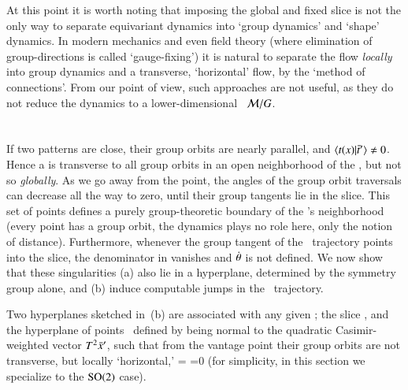 \documentclass[preprint,12pt]{elsarticle} %
\begin{document}
At this point it is worth noting that imposing the global and fixed slice
 is not the only way to separate equivariant dynamics into
`group dynamics' and `shape' dynamics. In modern mechanics
and even field theory (where elimination of group-directions is called
`gauge-fixing') it is natural to separate the flow {\em locally} into group dynamics
and a transverse, `horizontal' flow, by the
`method of connections'. From our point of
view, such approaches are not useful, as they do not reduce the dynamics
to a lower-dimensional \reducedsp\ ${\cal M}/G$.


\section{\Sset}
	\label{sec:singul}

If  two patterns are close, their group orbits are nearly parallel, and
$\braket{\groupTan(\ssp)}{\sliceTan{}} \neq 0$. Hence a {\slice} is
transverse to all group orbits in an open neighborhood of the {\template}
\slicep, but not so {\em globally}. As we go away from
the {\template} point, the angles of the group orbit traversals
can decrease all the way to zero, until their group tangents lie in the slice.
This set of points defines a purely group-theoretic boundary of
the {\template's} neighborhood (every point has a group orbit, the dynamics
plays no role here, only the notion of distance).
Furthermore, whenever the group tangent of the \reducedsp\ trajectory
points into the slice, the denominator in  vanishes
and {\angVel} $\dot{{\bf \theta}}$ is not defined. We now show that these
singularities (a) also lie in a hyperplane, determined by the symmetry
group alone, and (b) induce computable jumps in the \reducedsp\
trajectory.

 													\toCB
Two hyperplanes sketched in \,(b) are associated with
any given {\template} \slicep; the slice \refeq{PCsectQ}, and the
hyperplane of points \sspSing\ defined by being normal to  the quadratic
Casimir-weighted vector $T^2\bar{x}'$, such that from the {\template}
vantage point their group orbits are not transverse, but locally
`horizontal,'
\beq
\braket{\groupTan(\sspSing)}{\sliceTan{}}
 =
\edit{-\braket{\sspSing}{\Lg^2\slicep}}
 =0
(for simplicity, in this section we specialize to the  $\textrm{SO}(2)$ case).
\end{document}
